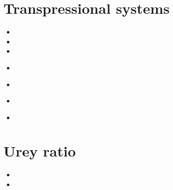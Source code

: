 \section{Transpressional systems} 

\begin{small}
\begin{itemize}
\item[\nineteenninetythree] 
\item[\nineteenninetyfour] 
\item[\nineteenninetyseven] 
\item[\twothousandthree] 
\\
\item[\twothousandeleven] 
\item[\twothousandseventeen] 
\\
\item[\twothousandeighteen] 
\end{itemize}
\end{small}

\section{Urey ratio}

\begin{small}
\begin{itemize}
\item[\twothousandeight] 
\item[\twothousandtwelve] 
\end{itemize}
\end{small}

